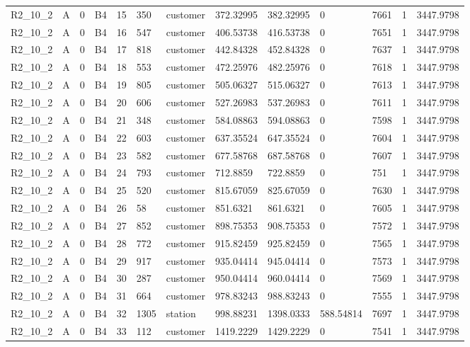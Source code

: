 \begin{longtable}{lllllllllllll}
R2\_10\_2 & A & 0 & B4 & 15 & 350 & customer & 372.32995 & 382.32995 & 0 & 7661 & 1 & 3447.9798 \\
R2\_10\_2 & A & 0 & B4 & 16 & 547 & customer & 406.53738 & 416.53738 & 0 & 7651 & 1 & 3447.9798 \\
R2\_10\_2 & A & 0 & B4 & 17 & 818 & customer & 442.84328 & 452.84328 & 0 & 7637 & 1 & 3447.9798 \\
R2\_10\_2 & A & 0 & B4 & 18 & 553 & customer & 472.25976 & 482.25976 & 0 & 7618 & 1 & 3447.9798 \\
R2\_10\_2 & A & 0 & B4 & 19 & 805 & customer & 505.06327 & 515.06327 & 0 & 7613 & 1 & 3447.9798 \\
R2\_10\_2 & A & 0 & B4 & 20 & 606 & customer & 527.26983 & 537.26983 & 0 & 7611 & 1 & 3447.9798 \\
R2\_10\_2 & A & 0 & B4 & 21 & 348 & customer & 584.08863 & 594.08863 & 0 & 7598 & 1 & 3447.9798 \\
R2\_10\_2 & A & 0 & B4 & 22 & 603 & customer & 637.35524 & 647.35524 & 0 & 7604 & 1 & 3447.9798 \\
R2\_10\_2 & A & 0 & B4 & 23 & 582 & customer & 677.58768 & 687.58768 & 0 & 7607 & 1 & 3447.9798 \\
R2\_10\_2 & A & 0 & B4 & 24 & 793 & customer & 712.8859 & 722.8859 & 0 & 751 & 1 & 3447.9798 \\
R2\_10\_2 & A & 0 & B4 & 25 & 520 & customer & 815.67059 & 825.67059 & 0 & 7630 & 1 & 3447.9798 \\
R2\_10\_2 & A & 0 & B4 & 26 & 58 & customer & 851.6321 & 861.6321 & 0 & 7605 & 1 & 3447.9798 \\
R2\_10\_2 & A & 0 & B4 & 27 & 852 & customer & 898.75353 & 908.75353 & 0 & 7572 & 1 & 3447.9798 \\
R2\_10\_2 & A & 0 & B4 & 28 & 772 & customer & 915.82459 & 925.82459 & 0 & 7565 & 1 & 3447.9798 \\
R2\_10\_2 & A & 0 & B4 & 29 & 917 & customer & 935.04414 & 945.04414 & 0 & 7573 & 1 & 3447.9798 \\
R2\_10\_2 & A & 0 & B4 & 30 & 287 & customer & 950.04414 & 960.04414 & 0 & 7569 & 1 & 3447.9798 \\
R2\_10\_2 & A & 0 & B4 & 31 & 664 & customer & 978.83243 & 988.83243 & 0 & 7555 & 1 & 3447.9798 \\
R2\_10\_2 & A & 0 & B4 & 32 & 1305 & station & 998.88231 & 1398.0333 & 588.54814 & 7697 & 1 & 3447.9798 \\
R2\_10\_2 & A & 0 & B4 & 33 & 112 & customer & 1419.2229 & 1429.2229 & 0 & 7541 & 1 & 3447.9798 \\

\end{longtable}

